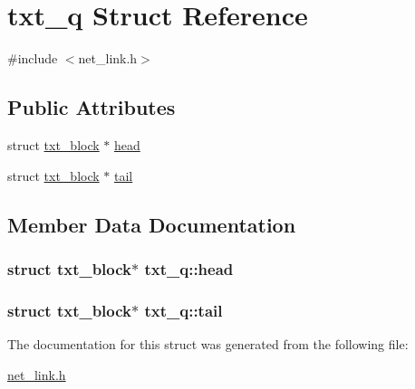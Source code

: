 \hypertarget{structtxt__q}{\section{txt\-\_\-q Struct Reference}
\label{structtxt__q}
}


{\ttfamily \#include $<$net\-\_\-link.\-h$>$}

\subsection*{Public Attributes}
\begin{DoxyCompactItemize}
\item 
struct \hyperlink{structtxt__block}{txt\-\_\-block} $\ast$ \hyperlink{structtxt__q_a17ae4428770db057fc2b34b44163d7ed}{head}
\item 
struct \hyperlink{structtxt__block}{txt\-\_\-block} $\ast$ \hyperlink{structtxt__q_aa2a76036aa81ed1c7b220ade291145ca}{tail}
\end{DoxyCompactItemize}


\subsection{Member Data Documentation}
\hypertarget{structtxt__q_a17ae4428770db057fc2b34b44163d7ed}{
\subsubsection[{head}]{\setlength{\rightskip}{0pt plus 5cm}struct {\bf txt\-\_\-block}$\ast$ txt\-\_\-q\-::head}}\label{structtxt__q_a17ae4428770db057fc2b34b44163d7ed}
\hypertarget{structtxt__q_aa2a76036aa81ed1c7b220ade291145ca}{
\subsubsection[{tail}]{\setlength{\rightskip}{0pt plus 5cm}struct {\bf txt\-\_\-block}$\ast$ txt\-\_\-q\-::tail}}\label{structtxt__q_aa2a76036aa81ed1c7b220ade291145ca}


The documentation for this struct was generated from the following file\-:\begin{DoxyCompactItemize}
\item 
\hyperlink{net__link_8h}{net\-\_\-link.\-h}\end{DoxyCompactItemize}
